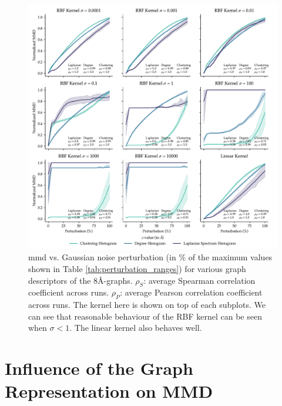 \begin{figure}[!htbp]
  \centering
  \includegraphics[width=\textwidth]{./figures/results/res_1_2.pdf}
  \caption[Influence of kernel parameters on \acrshort{mmd} behaviour.]{\acrshort{mmd} vs. Gaussian
    noise perturbation (in \% of the maximum values shown
    in Table \ref{tab:perturbation_ranges}) for various graph descriptors of the
    8\si{\angstrom}-graphs. $\rho_{S}$: average Spearman correlation coefficient
    across runs. $\rho_{P}$: average Pearson correlation coefficient across runs.
    The kernel here is shown on top of each subplots. We can see that reasonable
    behaviour of the RBF kernel can be seen when $\sigma<1$. The linear kernel also
    behaves well.}
  \label{fig:mmd_effect_kernel}
\end{figure}

\section{Influence of the Graph Representation on MMD}\label{sec:results_sensitivity}

